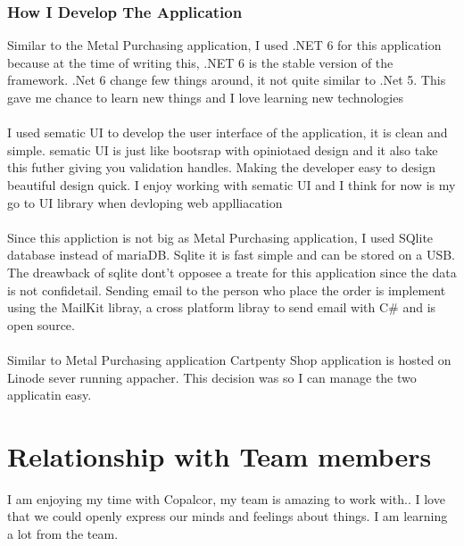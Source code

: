 \documentclass[paper=a4, fontsize=12pt]{scrartcl}
\numberwithin{equation}{section}		%
\numberwithin{figure}{section}			%
\numberwithin{table}{section}				%
\begin{document}
\subsubsection{How I Develop The Application}
Similar to the Metal Purchasing application, I used .NET 6 for this application
because at the time of writing this, .NET 6 is the stable version of the
framework. .Net 6 change few things around, it not quite similar to .Net 5. 
This gave me chance to learn new things and I love learning new technologies
\\
\\
I used sematic UI to develop the user interface of the application, it is 
clean and simple. sematic UI is just like bootsrap with opiniotaed design
and it also take this futher giving you validation handles. Making the developer 
easy to design beautiful design quick. I enjoy working with sematic UI and I 
think for now is my go to UI library when devloping web applliacation
\\
\\
Since this appliction is not big as Metal Purchasing application, I used 
SQlite database instead of mariaDB. Sqlite it is fast simple and can be 
stored on a USB. The dreawback of sqlite dont't opposee a treate for this 
application since the data is not confidetail. Sending email to the person
who place the order is implement using the MailKit libray, a cross platform
libray to send email with C\# and is open source.
\\
\\
Similar to Metal Purchasing application Cartpenty Shop application is 
hosted on Linode sever running appacher. This decision was so I can manage the two
applicatin easy.

\section{\textbf{Relationship with Team members} }
I am enjoying my time with Copalcor, my team is amazing to work with.. I love
that we could openly express our minds and feelings about things. I am learning
a lot from the team.


\end{document}

